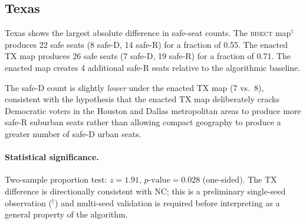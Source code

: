 \subsection{Texas}

Texas shows the largest absolute difference in safe-seat counts. The \textsc{bisect}
map$^\dagger$ produces 22 safe seats (8 safe-D, 14 safe-R) for a fraction of 0.55.
The enacted TX map produces 26 safe seats (7 safe-D, 19 safe-R) for a fraction of 0.71.
The enacted map creates 4 additional safe-R seats relative to the algorithmic baseline.

The safe-D count is slightly \textit{lower} under the enacted TX map (7 vs.\ 8),
consistent with the hypothesis that the enacted TX map deliberately cracks Democratic
voters in the Houston and Dallas metropolitan areas to produce more safe-R suburban
seats rather than allowing compact geography to produce a greater number of safe-D
urban seats.

\paragraph{Statistical significance.}
Two-sample proportion test: $z = 1.91$, $p\text{-value} = 0.028$ (one-sided). The
TX difference is directionally consistent with NC; this is a preliminary single-seed
observation ($^\dagger$) and multi-seed validation is required before interpreting as a
general property of the algorithm.
